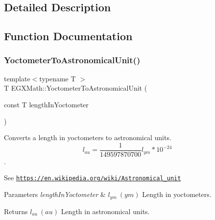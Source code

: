 \subsection{Detailed Description}


\subsection{Function Documentation}
\mbox{\label{group___e_g_x_math-_conversions-_length_conversions-_yoctometer-_astronomical_ga6963327b8caa5f9a231197768126efc2}} 
\subsubsection{\texorpdfstring{Yoctometer\+To\+Astronomical\+Unit()}{YoctometerToAstronomicalUnit()}}
{\footnotesize\ttfamily template$<$typename T $>$ \\
T E\+G\+X\+Math\+::\+Yoctometer\+To\+Astronomical\+Unit (\begin{DoxyParamCaption}\item[{const T}]{length\+In\+Yoctometer }\end{DoxyParamCaption})}



Converts a length in yoctometers to astronomical units. \[ l_{au}= \frac{1}{149597870700} l_{ym} * 10^{-24} \]. 

See \href{https://en.wikipedia.org/wiki/Astronomical_unit}{\tt https\+://en.\+wikipedia.\+org/wiki/\+Astronomical\+\_\+unit} 
\begin{DoxyParams}{Parameters}
{\em length\+In\+Yoctometer} & $ l_{ym}\ (ym)$ Length in yoctometers. \\
\hline
\end{DoxyParams}
\begin{DoxyReturn}{Returns}
$ l_{au}\ (au)$ Length in astronomical units. 
\end{DoxyReturn}
\mbox{\label{group___e_g_x_math-_conversions-_length_conversions-_yoctometer-_astronomical_gab1406f246c0472c4cef3ee0f5a6b1221}} 
